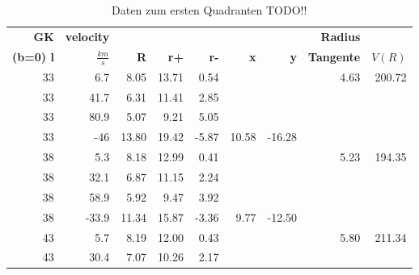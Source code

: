 

\listoffigures
\listoftables

\newpage
\begin{table}[H]
    \centering
    \caption{Daten zum ersten Quadranten TODO!!}
\begin{tabular}{|r|r|r|r|r|r|r|r|r|}
\hline
    {\textbf{GK}} & {\textbf{velocity}} & {} &   {} &   {} &    {} &    {} & {\textbf{Radius}} & {} \\
    {\textbf{(b=0) l}} & {\textbf{$\si{}{\frac{km}{s}}$}}& {\textbf{R}} &   {\textbf{r+}} &   {\textbf{r-}} &    {\textbf{x} }&    {\textbf{y}} & {\textbf{Tangente}} & {\textbf{$V(R)$}} \\
    \hline
            33 &        6.7 &       8.05 &      13.71 &       0.54 &            &            &       4.63 &     200.72 \\
    
            33 &       41.7 &       6.31 &      11.41 &       2.85 &            &            &            &            \\
    
            33 &       80.9 &       5.07 &       9.21 &       5.05 &            &            &            &            \\
    
            33 &        -46 &      13.80 &      19.42 &      -5.87 &      10.58 &     -16.28 &            &            \\
    \hline
            38 &        5.3 &       8.18 &      12.99 &       0.41 &            &            &       5.23 &     194.35 \\
    
            38 &       32.1 &       6.87 &      11.15 &       2.24 &            &            &            &            \\
    
            38 &       58.9 &       5.92 &       9.47 &       3.92 &            &            &            &            \\
    
            38 &      -33.9 &      11.34 &      15.87 &      -3.36 &       9.77 &     -12.50 &            &            \\
    \hline
            43 &        5.7 &       8.19 &      12.00 &       0.43 &            &            &       5.80 &     211.34 \\
    
            43 &       30.4 &       7.07 &      10.26 &       2.17 &            &            &            &            \\
    

\end{tabular}
\end{table}
